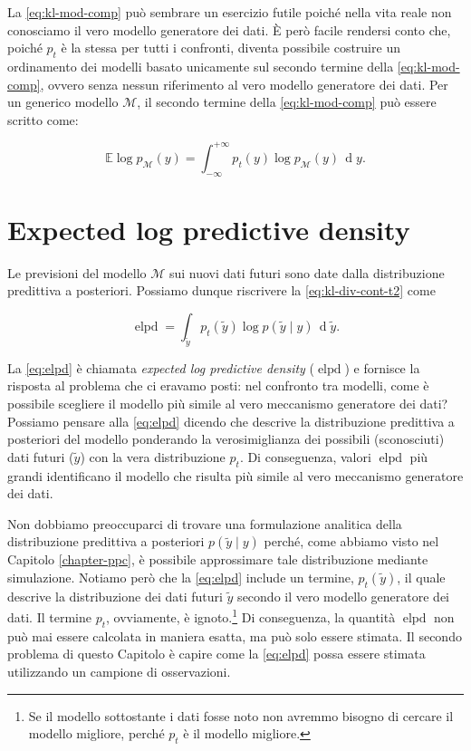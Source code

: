 \documentclass[
  11pt,
]{krantz}
\newcommand{\E}{\mathbb{E}} %
\DeclareMathOperator{\elpd}{elpd} %
\theoremstyle{definition}
\theoremstyle{definition}
\theoremstyle{definition}
\theoremstyle{definition}
\theoremstyle{remark}
\begin{document}
La \eqref{eq:kl-mod-comp} può sembrare un esercizio futile poiché nella vita reale non conosciamo il vero modello generatore dei dati. È però facile rendersi conto che, poiché \(p_t\) è la stessa per tutti i confronti, diventa possibile costruire un ordinamento dei modelli basato unicamente sul secondo termine della \eqref{eq:kl-mod-comp}, ovvero senza nessun riferimento al vero modello generatore dei dati. Per un generico modello \(\mathcal{M}\), il secondo termine della \eqref{eq:kl-mod-comp} può essere scritto come:

\begin{equation}
\E \log p_{\mathcal{M}}(y) = \int_{-\infty}^{+\infty}p_{t}(y)\log p_{\mathcal{M}}(y) \,\operatorname {d}\!y .
\label{eq:kl-div-cont-t2}
\end{equation}

\hypertarget{expected-log-predictive-density}{%
\section{Expected log predictive density}\label{expected-log-predictive-density}}

Le previsioni del modello \(\mathcal{M}\) sui nuovi dati futuri sono date dalla distribuzione predittiva a posteriori. Possiamo dunque riscrivere la \eqref{eq:kl-div-cont-t2} come

\begin{equation}
\elpd = \int_{\tilde{y}} p_{t}(\tilde{y}) \log p(\tilde{y} \mid y) \,\operatorname {d}\!\tilde{y}.
\label{eq:elpd}
\end{equation}

La \eqref{eq:elpd} è chiamata \emph{expected log predictive density} (\(\elpd\)) e fornisce la risposta al problema che ci eravamo posti: nel confronto tra modelli, come è possibile scegliere il modello più simile al vero meccanismo generatore dei dati? Possiamo pensare alla \eqref{eq:elpd} dicendo che descrive la distribuzione predittiva a posteriori del modello ponderando la verosimiglianza dei possibili (sconosciuti) dati futuri (\(\tilde{y}\)) con la vera distribuzione \(p_t\). Di conseguenza, valori \(\elpd\) più grandi identificano il modello che risulta più simile al vero meccanismo generatore dei dati.

Non dobbiamo preoccuparci di trovare una formulazione analitica della distribuzione predittiva a posteriori \(p(\tilde{y} \mid y)\) perché, come abbiamo visto nel Capitolo \ref{chapter-ppc}, è possibile approssimare tale distribuzione mediante simulazione. Notiamo però che la \eqref{eq:elpd} include un termine, \(p_t(\tilde{y})\), il quale descrive la distribuzione dei dati futuri \(\tilde{y}\) secondo il vero modello generatore dei dati. Il termine \(p_t\), ovviamente, è ignoto.\footnote{Se il modello sottostante i dati fosse noto non avremmo bisogno di cercare il modello migliore, perché \(p_t\) è il modello migliore.} Di conseguenza, la quantità \(\elpd\) non può mai essere calcolata in maniera esatta, ma può solo essere stimata. Il secondo problema di questo Capitolo è capire come la \eqref{eq:elpd} possa essere stimata utilizzando un campione di osservazioni.
\end{document}
